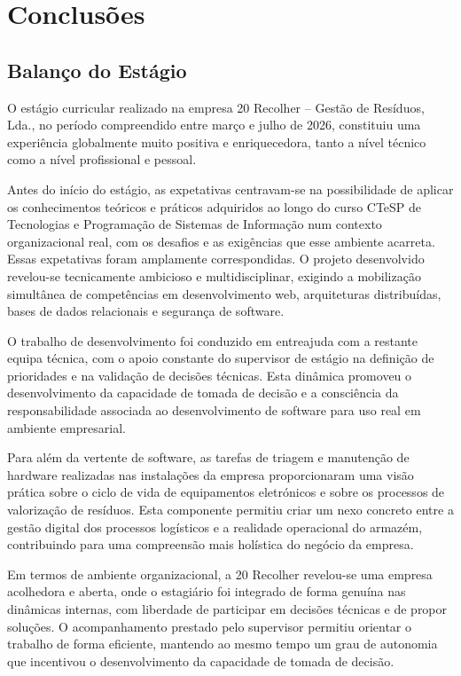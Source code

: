\chapter{Conclusões}\label{chap7}
\thispagestyle{fancy}

\section{Balanço do Estágio}

O estágio curricular realizado na empresa 20 Recolher -- Gestão de Resíduos, Lda., no período compreendido entre março e julho de 2026, constituiu uma experiência globalmente muito positiva e enriquecedora, tanto a nível técnico como a nível profissional e pessoal.

Antes do início do estágio, as expetativas centravam-se na possibilidade de aplicar os conhecimentos teóricos e práticos adquiridos ao longo do curso CTeSP de Tecnologias e Programação de Sistemas de Informação num contexto organizacional real, com os desafios e as exigências que esse ambiente acarreta. Essas expetativas foram amplamente correspondidas. O projeto desenvolvido revelou-se tecnicamente ambicioso e multidisciplinar, exigindo a mobilização simultânea de competências em desenvolvimento web, arquiteturas distribuídas, bases de dados relacionais e segurança de software.

O trabalho de desenvolvimento foi conduzido em entreajuda com a restante equipa técnica, com o apoio constante do supervisor de estágio na definição de prioridades e na validação de decisões técnicas. Esta dinâmica promoveu o desenvolvimento da capacidade de tomada de decisão e a consciência da responsabilidade associada ao desenvolvimento de software para uso real em ambiente empresarial.

Para além da vertente de software, as tarefas de triagem e manutenção de hardware realizadas nas instalações da empresa proporcionaram uma visão prática sobre o ciclo de vida de equipamentos eletrónicos e sobre os processos de valorização de resíduos. Esta componente permitiu criar um nexo concreto entre a gestão digital dos processos logísticos e a realidade operacional do armazém, contribuindo para uma compreensão mais holística do negócio da empresa.

Em termos de ambiente organizacional, a 20 Recolher revelou-se uma empresa acolhedora e aberta, onde o estagiário foi integrado de forma genuína nas dinâmicas internas, com liberdade de participar em decisões técnicas e de propor soluções. O acompanhamento prestado pelo supervisor permitiu orientar o trabalho de forma eficiente, mantendo ao mesmo tempo um grau de autonomia que incentivou o desenvolvimento da capacidade de tomada de decisão.

